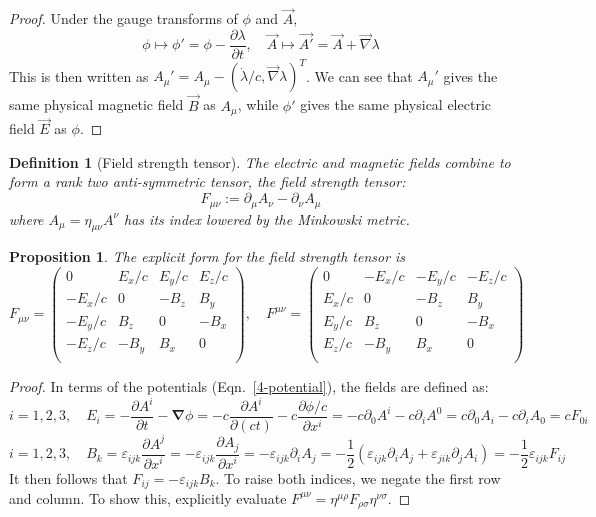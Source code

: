\documentclass[a4paper]{article}
\theoremstyle{new}
\newtheorem{defi}{Definition}[section]
\newtheorem{prop}{Proposition}[section]
\begin{document}
\begin{proof}
Under the gauge transforms of $\phi$ and $\vec{A}$,
$$\phi\mapsto\phi'=\phi-\frac{\partial\lambda}{\partial t},\quad\vec{A}\mapsto\vec{A'}=\vec{A}+\vec{\nabla}\lambda$$
This is then written as $A_\mu'=A_\mu-(\dot{\lambda}/c,\vec{\nabla}\lambda)^T$. We can see that $A_\mu'$ gives the same physical magnetic field $\vec{B}$ as $A_\mu$, while $\phi'$ gives the same physical electric field $\vec{E}$ as $\phi$.
\end{proof}
\begin{defi}[Field strength tensor]
The electric and magnetic fields combine to form a rank two anti-symmetric tensor, the field strength tensor:
\begin{equation}
F_{\mu\nu}:=\partial_\mu A_\nu-\partial_\nu A_\mu\label{fieldstrength}
\end{equation}
where $A_\mu=\eta_{\mu\nu}A^\nu$ has its index lowered by the Minkowski metric.
\end{defi}
\begin{prop}
The explicit form for the field strength tensor is
\begin{equation}
F_{\mu\nu}=\begin{pmatrix}0&E_x/c&E_y/c&E_z/c\\-E_x/c&0&-B_z&B_y\\-E_y/c&B_z&0&-B_x\\-E_z/c&-B_y&B_x&0\\\end{pmatrix},\quad F^{\mu\nu}=\begin{pmatrix}0&-E_x/c&-E_y/c&-E_z/c\\E_x/c&0&-B_z&B_y\\E_y/c&B_z&0&-B_x\\E_z/c&-B_y&B_x&0\\\end{pmatrix}\label{fieldstrength2}
\end{equation}
\end{prop}
\begin{proof}
In terms of the potentials (Eqn.~\ref{4-potential}), the fields are defined as:
$$i=1,2,3,\quad E_i=-\frac{\partial A^i}{\partial t}-\boldsymbol{\nabla}\phi=-c\frac{\partial A^i}{\partial(ct)}-c\frac{\partial\phi/c}{\partial x^i}=-c\partial_0A^i-c\partial_iA^0=c\partial_0A_i-c\partial_iA_0=cF_{0i}$$
$$i=1,2,3,\quad B_k=\varepsilon_{ijk}\frac{\partial A^j}{\partial x^i}=-\varepsilon_{ijk}\frac{\partial A_j}{\partial x^i}=-\varepsilon_{ijk}\partial_iA_j=-\frac{1}{2}(\varepsilon_{ijk}\partial_iA_j+\varepsilon_{jik}\partial_jA_i)=-\frac{1}{2}\varepsilon_{ijk}F_{ij}$$
It then follows that $F_{ij}=-\varepsilon_{ijk}B_k$. To raise both indices, we negate the first row and column. To show this, explicitly evaluate $F^{\mu\nu}=\eta^{\mu\rho}F_{\rho\sigma}\eta^{\nu\sigma}$.
\end{proof}
\end{document}
